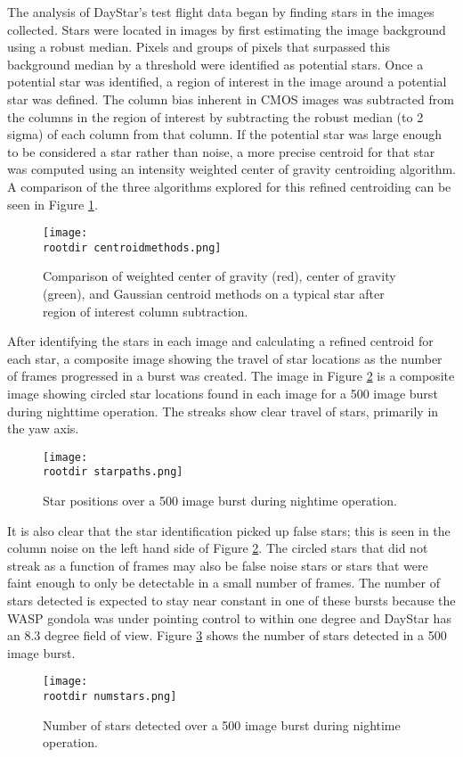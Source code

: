 \documentclass[twocolumn,letterpaper]{IEEEAerospace2012}
\newcommand{\rootdir}{./Figures/}
\begin{document}
The analysis of DayStar's test flight data began by finding stars in the images collected. Stars were located in images by first estimating the image background using a robust median. Pixels and groups of pixels that surpassed this background median by a threshold were identified as potential stars. Once a potential star was identified, a region of interest in the image around a potential star was defined. The column bias inherent in CMOS images was subtracted from the columns in the region of interest by subtracting the robust median (to 2 sigma) of each column from that column. If the potential star was large enough to be considered a star rather than noise, a more precise centroid for that star was computed using an intensity weighted center of gravity centroiding algorithm. A comparison of the three algorithms explored for this refined centroiding can be seen in Figure \ref{fig:centroidmethods}. 
\begin{figure}[H]
    \centering
    \texttt{[image: \\rootdir centroidmethods.png]}
    \caption{Comparison of weighted center of gravity (red), center of gravity (green), and Gaussian centroid methods on a typical star after region of interest column subtraction.}
    \label{fig:centroidmethods}
\end{figure}

After identifying the stars in each image and calculating a refined centroid for each star, a composite image showing the travel of star locations as the number of frames progressed in a burst was created. The image in Figure \ref{fig:starpaths} is a composite image showing circled star locations found in each image for a 500 image burst during nighttime operation. The streaks show clear travel of stars, primarily in the yaw axis.
\begin{figure}[H]
    \centering
    \texttt{[image: \\rootdir starpaths.png]}
    \caption{Star positions over a 500 image burst during nightime operation.}
    \label{fig:starpaths}
\end{figure}

It is also clear that the star identification picked up false stars; this is seen in the column noise on the left hand side of Figure \ref{fig:starpaths}. The circled stars that did not streak as a function of frames may also be false noise stars or stars that were faint enough to only be detectable in a small number of frames. The number of stars detected is expected to stay near constant in one of these bursts because the WASP gondola was under pointing control to within one degree and DayStar has an 8.3 degree field of view. Figure \ref{fig:numstars} shows the number of stars detected in a 500 image burst.
\begin{figure}[H]
    \centering
    \texttt{[image: \\rootdir numstars.png]}
    \caption{Number of stars detected over a 500 image burst during nightime operation.}
    \label{fig:numstars}
\end{figure}
\end{document}

